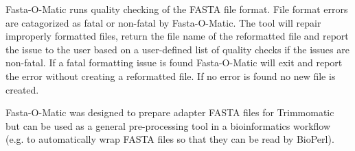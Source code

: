 Fasta-O-Matic runs quality checking of the FASTA file format. File format errors are catagorized as fatal or non-fatal by Fasta-O-Matic. The tool will repair improperly formatted files, return the file name of the reformatted file and report the issue to the user based on a user-defined list of quality checks if the issues are non-fatal. If a fatal formatting issue is found Fasta-O-Matic will exit and report the error without creating a reformatted file. If no error is found no new file is created.

Fasta-O-Matic was designed to prepare adapter FASTA files for Trimmomatic but can be used as a general pre-processing tool in a bioinformatics workflow (e.g. to automatically wrap FASTA files so that they can be read by BioPerl).
